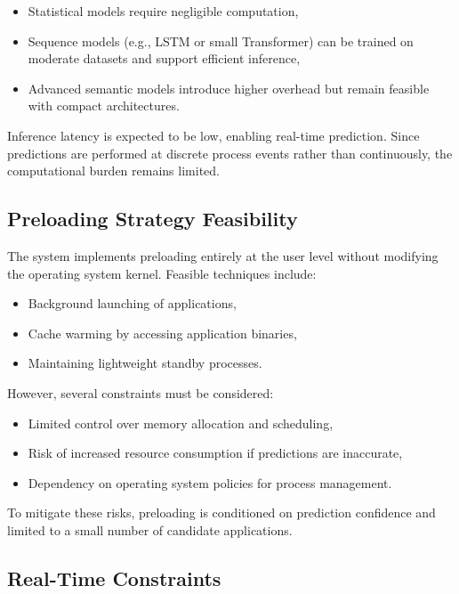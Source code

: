 \documentclass[11pt]{article}
\begin{document}
\begin{itemize}
\item Statistical models require negligible computation,
\item Sequence models (e.g., LSTM or small Transformer) can be trained on moderate datasets and support efficient inference,
\item Advanced semantic models introduce higher overhead but remain feasible with compact architectures.
\end{itemize}

Inference latency is expected to be low, enabling real-time prediction. Since predictions are performed at discrete process events rather than continuously, the computational burden remains limited.

\subsection{Preloading Strategy Feasibility}

The system implements preloading entirely at the user level without modifying the operating system kernel. Feasible techniques include:

\begin{itemize}
\item Background launching of applications,
\item Cache warming by accessing application binaries,
\item Maintaining lightweight standby processes.
\end{itemize}

However, several constraints must be considered:

\begin{itemize}
\item Limited control over memory allocation and scheduling,
\item Risk of increased resource consumption if predictions are inaccurate,
\item Dependency on operating system policies for process management.
\end{itemize}

To mitigate these risks, preloading is conditioned on prediction confidence and limited to a small number of candidate applications.

\subsection{Real-Time Constraints}
\end{document}
